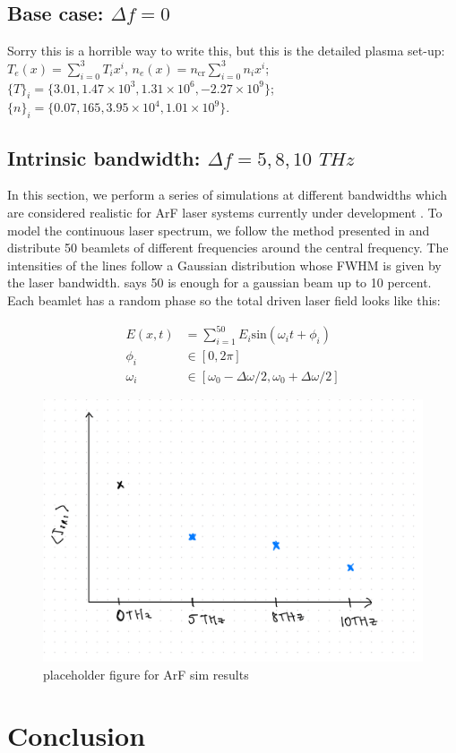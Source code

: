 \subsection{Base case: $\Delta f=0$}
Sorry this is a horrible way to write this, but this is the detailed plasma set-up: $T_e(x) = \sum^3_{i=0} T_i x^i$, $n_e(x) = n_{\mathrm{cr}}\sum^3_{i=0} n_i x^i $;
$\{T\}_i  = \{3.01, 1.47\times10^3,1.31\times10^6,-2.27\times10^9\}$;
$\{n\}_i  = \{0.07, 165, 3.95\times10^4, 1.01\times10^9\}$.



\subsection{Intrinsic bandwidth: $\Delta f =5,8,10$ $\si{THz}$}
In this section, we perform a series of simulations at different bandwidths which are considered realistic for ArF laser systems currently under development \citep{Obenschain2020}. To model the continuous laser spectrum, we follow the method presented in \citet{Bates2020} and distribute 50 beamlets of different frequencies around the central frequency. The intensities of the lines follow a Gaussian distribution whose FWHM is given by the laser bandwidth. \citet{Follett2019} says 50 is enough for a gaussian beam up to 10 percent. Each beamlet has a random phase so the total driven laser field looks like this:



\begin{equation}
\begin{aligned}
	E(x,t) &= \sum_{i=1}^{50} E_i \mathrm{sin}(\omega_i t + \phi_i) \\
	\phi_i & \in  [0,2\pi] \\
	\omega_i & \in [\omega_0 - \Delta\omega / 2, \omega_0 + \Delta\omega / 2]
\end{aligned}
\end{equation}

\begin{figure}[ht]
   \centering
    \includegraphics[width=0.75\columnwidth]{Chapters/C5_broadband/arf_placeholder.jpeg}
    \caption{placeholder figure for ArF sim results}
    \label{fig:ArF}
\end{figure}{}


\section{Conclusion}


%
%
